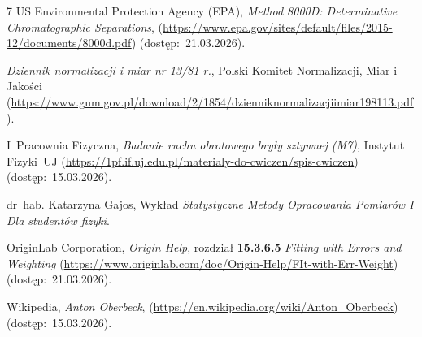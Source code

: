 \documentclass[twocolumn, a4paper, polish, 10pt]{article}
\begin{document}
\begin{thebibliography}{7}
     US Environmental Protection Agency (EPA), \emph{Method 8000D: Determinative Chromatographic Separations}, (\url{https://www.epa.gov/sites/default/files/2015-12/documents/8000d.pdf}) (dostęp:~21.03.2026).

     \emph{Dziennik normalizacji i miar nr 13/81 r.}, Polski Komitet Normalizacji, Miar i Jakości (\url{https://www.gum.gov.pl/download/2/1854/dzienniknormalizacjiimiar198113.pdf}).

     I~Pracownia Fizyczna, \emph{Badanie ruchu obrotowego bryły sztywnej (M7)}, Instytut Fizyki~UJ (\url{https://1pf.if.uj.edu.pl/materialy-do-cwiczen/spis-cwiczen}) (dostęp:~15.03.2026).

     dr~hab. \mbox{Katarzyna} \mbox{Gajos}, Wykład \emph{Statystyczne Metody Opracowania Pomiarów I Dla studentów fizyki}.

     OriginLab Corporation, \emph{Origin Help}, rozdział \textbf{15.3.6.5} \emph{Fitting with Errors and Weighting} (\url{https://www.originlab.com/doc/Origin-Help/FIt-with-Err-Weight}) (dostęp:~21.03.2026).
    
    Wikipedia, \emph{Anton Oberbeck}, (\url{https://en.wikipedia.org/wiki/Anton_Oberbeck}) (dostęp:~15.03.2026).
\end{thebibliography}
\end{document}
